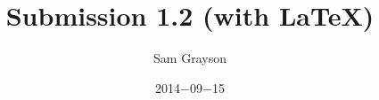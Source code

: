 
\documentclass[12pt,letterpaper]{article}

\usepackage{amssymb}
\usepackage{amsmath}
\usepackage{graphicx}
\usepackage[letterpaper, margin=0.75in]{geometry}
\usepackage{setspace}
\usepackage{python}
\usepackage{array}
\usepackage{amstext}

\renewcommand{\line}{\\[-1.5ex]\rule{\linewidth}{.4pt}} %
\newcommand{\lif}{\rightarrow}
\newcommand{\liff}{\leftrightarrow}
\newcommand{\specialcell}[2][c]{%
  \begin{tabular}[#1]{@{}c@{}}#2\end{tabular}}
\newenvironment{myproof}{\begin{tabular}[t]{c >{$}c<{$} c}}{\end{tabular}}

\title{Submission 1.2 (with \LaTeX)}
\date{2014$-$09$-$15}
\author{Sam Grayson}


\maketitle
\singlespacing

\section{Arguments in English}
\begin{enumerate}

\end{enumerate}

\section{Claims}
\begin{enumerate}

\end{enumerate}

\section{Other}
\begin{enumerate}

\end{enumerate}


